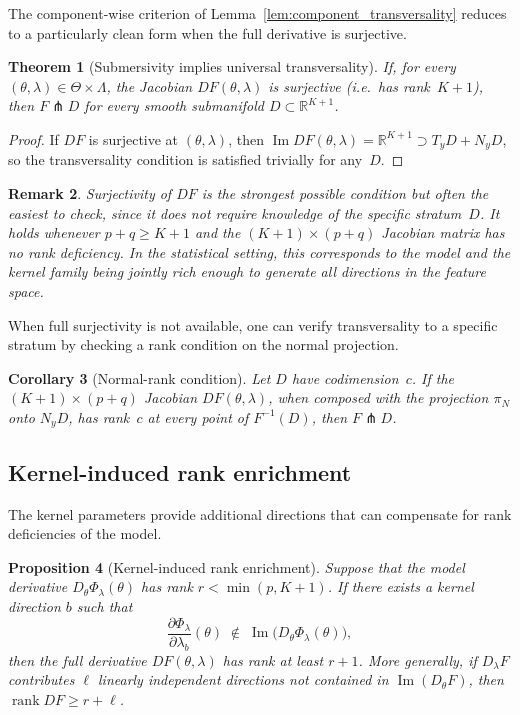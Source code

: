 \documentclass[11pt,a4paper]{article}
\newtheorem{theorem}{Theorem}[section]
\newtheorem{proposition}[theorem]{Proposition}
\newtheorem{corollary}[theorem]{Corollary}
\newtheorem{remark}[theorem]{Remark}
\newcommand{\R}{\mathbb{R}}
\begin{document}
The component-wise criterion of
Lemma~\ref{lem:component_transversality} reduces to a particularly
clean form when the full derivative is surjective.

\begin{theorem}[Submersivity implies universal transversality]
\label{thm:submersivity}
If, for every $(\theta,\lambda)\in\Theta\times\Lambda$, the Jacobian
$DF(\theta,\lambda)$ is surjective (i.e.\ has rank~$K+1$), then
$F\pitchfork D$ for \emph{every} smooth submanifold
$D\subset\R^{K+1}$.
\end{theorem}

\begin{proof}
If $DF$ is surjective at $(\theta,\lambda)$, then
$\operatorname{Im} DF(\theta,\lambda) = \R^{K+1} \supset
T_y D + N_y D$, so the transversality condition is satisfied
trivially for any~$D$.
\end{proof}

\begin{remark}
Surjectivity of $DF$ is the strongest possible condition but
often the easiest to check, since it does not require knowledge of
the specific stratum~$D$.  It holds whenever $p + q \geq K+1$ and
the $(K+1)\times(p+q)$ Jacobian matrix has no rank deficiency.
In the statistical setting, this corresponds to the model and the
kernel family being jointly rich enough to generate all directions
in the feature space.
\end{remark}

When full surjectivity is not available, one can verify transversality
to a specific stratum by checking a rank condition on the normal
projection.

\begin{corollary}[Normal-rank condition]
\label{cor:normal_rank}
Let $D$ have codimension~$c$.  If the $(K+1)\times(p+q)$ Jacobian
$DF(\theta,\lambda)$, when composed with the projection $\pi_N$ onto
$N_y D$, has rank~$c$ at every point of $F^{-1}(D)$, then
$F\pitchfork D$.
\end{corollary}


\subsection{Kernel-induced rank enrichment}

The kernel parameters provide additional directions that can
compensate for rank deficiencies of the model.

\begin{proposition}[Kernel-induced rank enrichment]
\label{prop:kernel_rank}
Suppose that the model derivative $D_\theta\Phi_\lambda(\theta)$ has
rank $r < \min(p, K\!+\!1)$.  If there exists a kernel direction
$b$ such that
\[
  \frac{\partial \Phi_\lambda}{\partial \lambda_b}(\theta)
  \;\notin\;
  \operatorname{Im}\bigl(D_\theta\Phi_\lambda(\theta)\bigr),
\]
then the full derivative $DF(\theta,\lambda)$ has rank at least
$r+1$.  More generally, if $D_\lambda F$ contributes $\ell$ linearly
independent directions not contained in
$\operatorname{Im}(D_\theta F)$, then
$\operatorname{rank} DF \geq r + \ell$.
\end{proposition}
\end{document}
